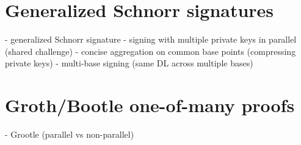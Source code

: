 \begin{appendices}
\section{Generalized Schnorr signatures}
\label{appendix:generalized-schnorr-signatures}

- generalized Schnorr signature
    - signing with multiple private keys in parallel (shared challenge)
    - concise aggregation on common base points (compressing private keys)
    - multi-base signing (same DL across multiple bases)



\section{Groth/Bootle one-of-many proofs}
\label{appendix:grootle-one-of-many-proofs}

- Grootle (parallel vs non-parallel)



\end{appendices}